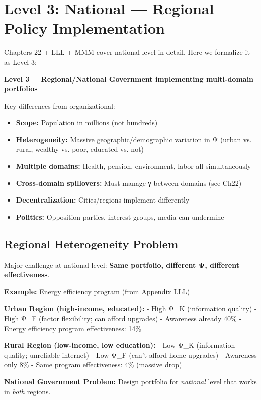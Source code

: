 \section{Level 3: National --- Regional Policy Implementation}
\label{sec:level3-national}

Chapters 22 + LLL + MMM cover national level in detail. Here we formalize it as Level 3:

\textbf{Level 3 = Regional/National Government implementing multi-domain portfolios}

Key differences from organizational:
\begin{itemize}
\item \textbf{Scope:} Population in millions (not hundreds)
\item \textbf{Heterogeneity:} Massive geographic/demographic variation in Ψ (urban vs. rural, wealthy vs. poor, educated vs. not)
\item \textbf{Multiple domains:} Health, pension, environment, labor all simultaneously
\item \textbf{Cross-domain spillovers:} Must manage γ between domains (see Ch22)
\item \textbf{Decentralization:} Cities/regions implement differently
\item \textbf{Politics:} Opposition parties, interest groups, media can undermine
\end{itemize}

\subsection{Regional Heterogeneity Problem}

Major challenge at national level: \textbf{Same portfolio, different Ψ, different effectiveness}.

\textbf{Example:} Energy efficiency program (from Appendix LLL)

\textbf{Urban Region (high-income, educated):}
- High Ψ\_K (information quality)
- High Ψ\_F (factor flexibility; can afford upgrades)
- Awareness already 40\%
- Energy efficiency program effectiveness: 14\%

\textbf{Rural Region (low-income, low education):}
- Low Ψ\_K (information quality; unreliable internet)
- Low Ψ\_F (can't afford home upgrades)
- Awareness only 8\%
- Same program effectiveness: 4\% (massive drop)

\textbf{National Government Problem:} Design portfolio for \emph{national} level that works in \emph{both} regions.

